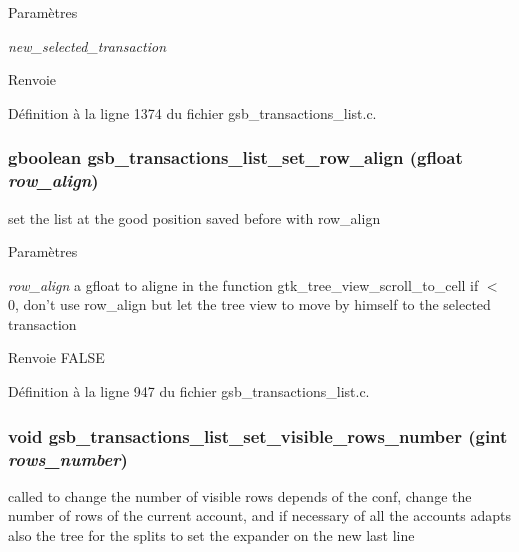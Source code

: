 \begin{DoxyParams}{Paramètres}
\item[{\em new\_\-selected\_\-transaction}]\end{DoxyParams}
\begin{DoxyReturn}{Renvoie}

\end{DoxyReturn}


Définition à la ligne 1374 du fichier gsb\_\-transactions\_\-list.c.

\subsubsection[{gsb\_\-transactions\_\-list\_\-set\_\-row\_\-align}]{\setlength{\rightskip}{0pt plus 5cm}gboolean gsb\_\-transactions\_\-list\_\-set\_\-row\_\-align (gfloat {\em row\_\-align})}\label{gsb__transactions__list_8h_a6de9b44e088a49d4d6328209a24443c2}
set the list at the good position saved before with row\_\-align


\begin{DoxyParams}{Paramètres}
\item[{\em row\_\-align}]a gfloat to aligne in the function gtk\_\-tree\_\-view\_\-scroll\_\-to\_\-cell if $<$ 0, don't use row\_\-align but let the tree view to move by himself to the selected transaction\end{DoxyParams}
\begin{DoxyReturn}{Renvoie}
FALSE 
\end{DoxyReturn}


Définition à la ligne 947 du fichier gsb\_\-transactions\_\-list.c.

\subsubsection[{gsb\_\-transactions\_\-list\_\-set\_\-visible\_\-rows\_\-number}]{\setlength{\rightskip}{0pt plus 5cm}void gsb\_\-transactions\_\-list\_\-set\_\-visible\_\-rows\_\-number (gint {\em rows\_\-number})}\label{gsb__transactions__list_8h_a8da293358f10b57d3107c903fbd4ef12}
called to change the number of visible rows depends of the conf, change the number of rows of the current account, and if necessary of all the accounts adapts also the tree for the splits to set the expander on the new last line


